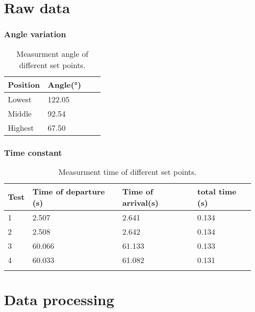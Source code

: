 	\section*{Raw data}
	
		\subsubsection*{Angle variation}

\begin{table}[htbp]
	\centering
	\caption{Measurment angle of different set points.}
	\label{RPMData}
	\begin{tabular}{llll}
		Position & Angle{(}°{)}  \\ \hline  \rowcolor{lightGrey}
		Lowest      &  122.05                      \\
		Middle      & 92.54  \\  \rowcolor{lightGrey}
		Highest      & 67.50 \\              
	\end{tabular}
\end{table}

		\subsubsection*{Time constant}

\begin{table}[htbp]
	\centering
	\caption{Measurment time of different set points.}
	\label{RPMData}
	\begin{tabular}{llll}
		Test & Time of departure {(}s{)}& Time of arrival{(}s{)} & total time {(}s{)} \\ \hline  \rowcolor{lightGrey}
		1     & 2.507              & 2.641             & 0.134                     \\
		2     & 2.508              & 2.642 & 0.134                                 \\  \rowcolor{lightGrey}
		3     & 60.066              & 61.133 & 0.133                                 \\ 
		4     & 60.033             & 61.082            & 0.131                    \\  \rowcolor{lightGrey}             
	\end{tabular}
\end{table}


	\section*{Data processing}	
	
